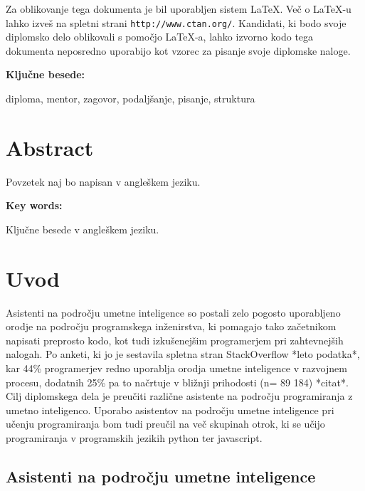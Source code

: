 \documentclass[12pt,a4paper]{book}
\begin{document}
Za oblikovanje tega dokumenta je bil uporabljen sistem \LaTeX.
Ve\v c o \LaTeX-u lahko izve\v s na spletni strani \texttt{http://www.ctan.org/}.
Kandidati, ki bodo svoje diplomsko delo oblikovali s pomo\v cjo
\LaTeX-a, lahko izvorno kodo tega dokumenta neposredno uporabijo kot vzorec za pisanje svoje diplomske naloge.

\vspace{1.3cm}
\noindent
{\large \bf Ključne besede:}

\vspace{0.5cm}
\noindent
diploma, mentor, zagovor, podaljšanje, pisanje, struktura


\chapter*{Abstract}


Povzetek naj bo napisan v angleškem jeziku.

\vspace{1.3cm}
\noindent
{\large \bf Key words:}

\vspace{0.5cm}
\noindent
Ključne besede v angleškem jeziku.



\chapter{Uvod}
Asistenti na področju umetne inteligence so postali zelo pogosto uporabljeno orodje na področju programskega inženirstva, ki pomagajo tako začetnikom napisati preprosto kodo, kot tudi izkušenejšim programerjem pri zahtevnejših nalogah. Po anketi, ki jo je sestavila spletna stran StackOverflow *leto podatka*, kar 44\% programerjev redno uporablja orodja umetne inteligence v razvojnem procesu, dodatnih 25\% pa to načrtuje v bližnji prihodosti (n= 89 184) *citat*. Cilj diplomskega dela je preučiti različne asistente na področju programiranja z umetno inteligenco. Uporabo asistentov na področju umetne inteligence pri učenju programiranja bom tudi preučil na več skupinah otrok, ki se učijo programiranja v programskih jezikih python ter javascript.

\section{Asistenti na področju umetne inteligence} 
 
\end{document}

